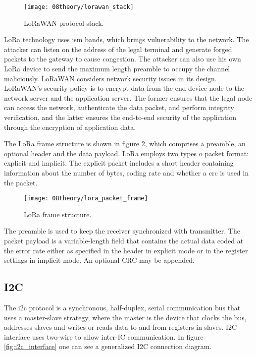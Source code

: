 \begin{figure}[H]
	\centering
	\texttt{[image: 08theory/lorawan\_stack]}
	\caption{LoRaWAN protocol stack.}
	\label{fig:lorawan_stack}
\end{figure}

LoRa technology uses \ac{ism} bands, which brings vulnerability to the network. The attacker can listen on the address of the legal terminal and generate forged packets to the gateway to cause congestion. The attacker can also use his own LoRa device to send the maximum length preamble to occupy the channel maliciously. LoRaWAN considers network security issues in its design. LoRaWAN’s security policy is to encrypt data from the end device node to the network server and the application server. The former ensures that the legal node can access the network, authenticate the data packet, and perform integrity verification, and the latter ensures the end-to-end security of the application through the encryption of application data. \cite{lora_physical_layer}


The LoRa frame structure is shown in figure \ref{fig:lora_packet_frame}, which comprises a preamble, an optional header and the data payload. LoRa employs two types o packet format: explicit and implicit. The explicit packet includes a short header containing information about the number of bytes, coding rate and whether a \ac{crc} is used in the packet.

\begin{figure}[H]
	\centering
	\texttt{[image: 08theory/lora\_packet\_frame]}
	\caption{LoRa frame structure.}
	\label{fig:lora_packet_frame}
\end{figure}

The preamble is used to keep the receiver synchronized with transmitter. The packet payload is a variable-length field that contains the actual data coded at the error rate either as specified in the header  in  explicit  mode  or  in  the  register  settings  in  implicit  mode. An  optional  CRC  may  be  appended. 

\clearpage
\subsection{I2C}
The \ac{i2c} protocol is a synchronous, half-duplex, serial communication bus that uses a master-slave strategy, where the master is the device that clocks the bus, addresses slaves and writes or reads data to and from registers in slaves. I2C interface uses two-wire to allow inter-IC communication. In figure \ref{fig:i2c_interface} one can see a generalized I2C connection diagram. \cite{i2c_interface}

